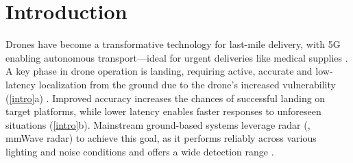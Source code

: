 \section{Introduction}


Drones have become a transformative technology for last-mile delivery, with 5G enabling autonomous transport—ideal for urgent deliveries like medical supplies \cite{floreano2015science, MedicalDelivery}. 
A key phase in drone operation is landing, requiring active, accurate and low-latency localization from the ground due to the drone's increased vulnerability (\fig \ref{intro}a) \cite{wang2022micnest, zhao2023smoothlander, sun2023indoor}. 
Improved accuracy increases the chances of successful landing on target platforms, while lower latency enables faster responses to unforeseen situations \cite{famili2022pilot, he2023acoustic, chi2022wi} (\fig \ref{intro}b).
Mainstream ground-based systems leverage radar (\eg, mmWave radar) to achieve this goal, as it performs reliably across various lighting and noise conditions and offers a wide detection range \tocite.




